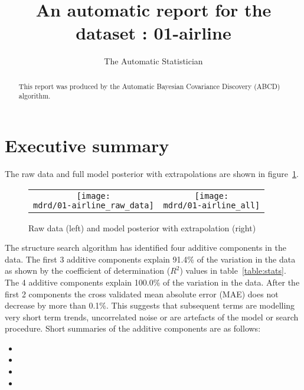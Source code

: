 \documentclass{article} %
\title{An automatic report for the dataset : 01-airline}
\author{
The Automatic Statistician
}
\begin{document}
\allowdisplaybreaks

\maketitle

\begin{abstract}
This report was produced by the Automatic Bayesian Covariance Discovery (ABCD) algorithm.
\end{abstract}

\section{Executive summary}

The raw data and full model posterior with extrapolations are shown in figure~\ref{fig:rawandfit}.

\begin{figure}[H]
\newcommand{\wmgd}{0.5\columnwidth}
\newcommand{\hmgd}{3.0cm}
\newcommand{\mdrd}{01-airline}
\newcommand{\mbm}{\hspace{-0.3cm}}
\begin{tabular}{cc}
\mbm \texttt{[image: \\mdrd/01-airline\_raw\_data]} & \texttt{[image: \\mdrd/01-airline\_all]}
\end{tabular}
\caption{Raw data (left) and model posterior with extrapolation (right)}
\label{fig:rawandfit}
\end{figure}

The structure search algorithm has identified four additive components in the data.
The  first 3 additive components explain 91.4\% of the variation in the data as shown by the coefficient of determination ($R^2$) values in table~\ref{table:stats}.
The 4 additive components explain 100.0\% of the variation in the data.
After the first 2 components the cross validated mean absolute error (MAE) does not decrease by more than 0.1\%.
This suggests that subsequent terms are modelling very short term trends, uncorrelated noise or are artefacts of the model or search procedure.
Short summaries of the additive components are as follows:
\begin{itemize}

  \item  

  \item  

  \item  

  \item  

\end{itemize}
\end{document}
